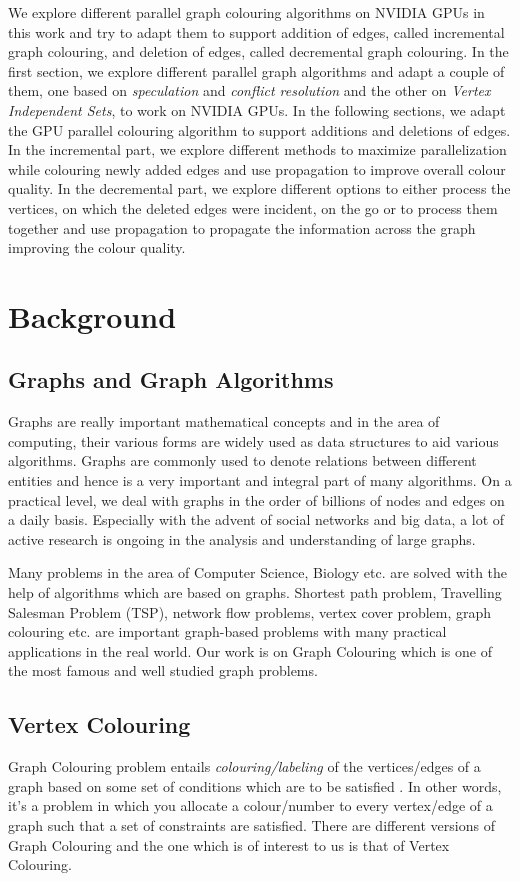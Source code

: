 \documentclass[MTech]{iitmdiss}
\begin{document}
We explore different parallel graph colouring algorithms on NVIDIA GPUs in this work and try to adapt them to support addition of edges, called incremental graph colouring, and deletion of edges, called decremental graph colouring. In the first section, we explore different parallel graph algorithms and adapt a couple of them, one based on \textit{speculation} and \textit{conflict resolution} and the other on \textit{Vertex Independent Sets}, to work on NVIDIA GPUs. In the following sections, we adapt the GPU parallel colouring algorithm to support additions and deletions of edges. In the incremental part, we explore different methods to maximize parallelization while colouring newly added edges and use propagation to improve overall colour quality. In the decremental part, we explore different options to either process the vertices, on which the deleted edges were incident, on the go or to process them together and use propagation to propagate the information across the graph improving the colour quality. 
\chapter{Background}
\section{Graphs and Graph Algorithms}
Graphs are really important mathematical concepts and in the area of computing, their various forms are widely used as data structures to aid various algorithms. Graphs are commonly used to denote relations between different entities and hence is a very important and integral part of many algorithms. On a practical level, we deal with graphs in the order of billions of nodes and edges on a daily basis. Especially with the advent of social networks and big data, a lot of active research is ongoing in the analysis and understanding of large graphs.

Many problems in the area of Computer Science, Biology etc. are solved with the help of algorithms which are based on graphs. Shortest path problem, Travelling Salesman Problem (TSP), network flow problems, vertex cover problem, graph colouring etc. are important graph-based problems with many practical applications in the real world. Our work is on Graph Colouring which is one of the most famous and well studied graph problems.
\section{Vertex Colouring}
Graph Colouring problem entails \textit{colouring/labeling} of the vertices/edges of a graph based on some set of conditions which are to be satisfied \citep{jensen2011graph}. In other words, it's a problem in which you allocate a colour/number to every vertex/edge of a graph such that a set of constraints are satisfied. There are different versions of Graph Colouring and the one which is of interest to us is that of Vertex Colouring.
\end{document}
